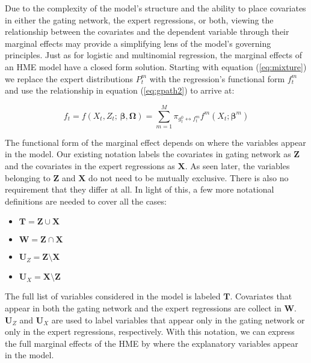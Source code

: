 \documentclass[12pt]{article}
\newcommand{\gateprod}[2]{\pi_{#1 \longleftrightarrow #2}}
\begin{document}
Due to the complexity of the model's structure and the ability to 
place covariates in either the gating network, the expert regressions,
or both, viewing the relationship between the covariates and the dependent
variable through their marginal effects may provide a simplifying lens of the 
model's governing principles. Just as for logistic and multinomial regression,
the marginal effects of an HME model have a closed form solution. Starting
with equation (\ref{eq:mixture}) we replace the expert distributions
$P^{m}_{t}$ with the regression's functional form $f^{m}_{t}$ and use
the relationship in equation (\ref{eq:gpath2}) to arrive at: 

\begin{equation} \label{eq:mixture2}
  f_{t} = f(X_{t}, Z_{t}; \, \boldsymbol{\beta}, \boldsymbol{\Omega}) = \sum_{m=1}^{M} \gateprod{g^{0}_{t}}{f^{m}_{t}} f^{m}(X_{t}; \boldsymbol{\beta}^{m})
\end{equation}

The functional form of the marginal effect depends on where the variables
appear in the model. Our existing notation labels the covariates in gating
network as $\boldsymbol{Z}$ and the covariates in the expert regressions 
as $\boldsymbol{X}$. As seen later, the variables belonging to
$\boldsymbol{Z}$ and $\boldsymbol{X}$ do not need to be mutually
exclusive. There is also no requirement that they differ at all.
In light of this, a few more notational definitions are needed to cover
all the cases:

\begin{itemize}  
  \item $\boldsymbol{T} = \boldsymbol{Z} \cup \boldsymbol{X}$
  \item $\boldsymbol{W} = \boldsymbol{Z} \cap \boldsymbol{X}$
  \item $\boldsymbol{U}_{Z} = \boldsymbol{Z} \setminus \boldsymbol{X}$
  \item $\boldsymbol{U}_{X} = \boldsymbol{X} \setminus \boldsymbol{Z}$
\end{itemize}


The full list of variables considered in the model is labeled $\boldsymbol{T}$.
Covariates that appear in both the gating network and the expert regressions
are collect in $\boldsymbol{W}$. $\boldsymbol{U}_{Z}$ and $\boldsymbol{U}_{X}$ are
used to label variables that appear only in the gating network or only in the expert
regressions, respectively. With this notation, we can express the full marginal effects
of the HME by where the explanatory variables appear in the model.
\end{document}
